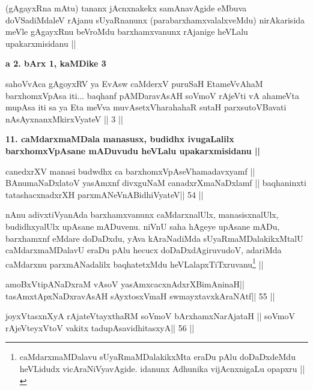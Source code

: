 \begin{artha}
(gAgayxRna mAtu) tananx jAcnxnakekx samAnavAgide  eMbuva doVSadiMdaleV rAjanu sUyaRnanunx (parabarxhamxvalalxveMdu) nirAkarisida meVle gAgayxRnu beVroMdu barxhamxvanunx rAjanige heVLalu upakarxmisidanu ||
\end{artha} 

\begin{center}
{\large\bf a 2. bArx 1, kaMDike 3}
\end{center}

\begin{shl}
sahoVvAca gAgoyxRV ya EvAsw caMderxV puruSaH
EtameVvAhaM barxhomxVpAsa iti...
baqhanf pAMDaravAsAH soVmoV rAjeVti
vA ahameVta mupAsa iti sa ya Eta meVva
muvAsetxV\s harahahaR sutaH parxsutoVBavati
nAsAyxnanxMkirxVyateV || 3 ||
\end{shl}

\begin{artha}
{\bf 11. caMdarxmaMDala manasusx, budidhx ivugaLalilx barxhomxVpAsane mADuvudu heVLalu upakarxmisidanu ||}
\end{artha} 

\begin{shl}
canedxrXV manasi budwdhx ca barxhomxVpAseV\s hamadavxyamf ||
BAnumaNaDxlatoV yasAmxnf divxguNaM canadxrXmaNaDxlamf ||
baqhaninxti tatashacxnadxrXH parxmANeVnABidhiVyateV\hfill || 54 ||
\end{shl}

\begin{artha}
nAnu adivxtiVyanAda barxhamxvanunx caMdarxnalUlx, manasisxnalUlx, 
budidhxyalUlx upAsane mADuvenu. niVnU saha hAgeye upAsane mADu, 
barxhamxnf eMdare doDaDxdu, yAva kAraNadiMda sUyaRmaMDalakikxMtalU caMdarxmaMDalavU eraDu pAlu hecucx doDaDxdAgiruvudoV, adariMda caMdarxnu parxmANadalilx baqhatetxMdu heVLalapxTiTxruvanu\footnote[8]{caMdarxmaMDalavu sUyaRmaMDalakikxMta eraDu pAlu doDaDxdeMdu heVLidudx vicAraNiVyavAgide. idanunx Adhunika vijAcnxnigaLu opapxru ||} ||
\end{artha}

\begin{shl}
amoBxV\s tipANaDxraM vAsoV yasAmxcacxnAdxrXBimAninaH||
tasAmxtApxNaDxravAsAH sAyxtosxVmaH swmayxtavxkAraNAtf\hfill || 55 ||
\end{shl}

\begin{shl}
joyxVtasxnXyA rAjateV\s tayxthaRM soVmoV bArxhamxNarAjataH ||
soVmoV rAjeVteyxVtoV vakitx tadupAsavidhitasxyA\hfill || 56 ||
\end{shl}

